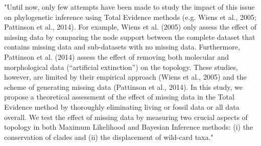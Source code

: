\documentclass[12pt,letterpaper]{article}
\begin{document}
\begin{enumerate}
"Until now, only few attempts have been made to study the impact of this issue on phylogenetic inference using Total Evidence methods (e.g. Wiens et al., 2005; Pattinson et al., 2014).%
For example, Wiens et al. (2005) %
 only assess the effect of missing data by comparing the node support between the complete dataset that contains missing data and sub-datasets with no missing data.
Furthermore, Pattinson et al. (2014) %
 assess the effect of removing both molecular and morphological data (``artificial extinction'') on the topology.
These studies, however, are limited by their empirical approach (Wiens et al., 2005) and the scheme of generating missing data (Pattinson et al., 2014).
In this study, we propose a theoretical assessment of the effect of missing data in the Total Evidence method by thoroughly eliminating living or fossil data or all data overall.
We test the effect of missing data by measuring two crucial aspects of topology in both Maximum Likelihood and Bayesian Inference methods: (i) the conservation of clades and (ii) the displacement of wild-card taxa."



\end{enumerate}
\end{document}
